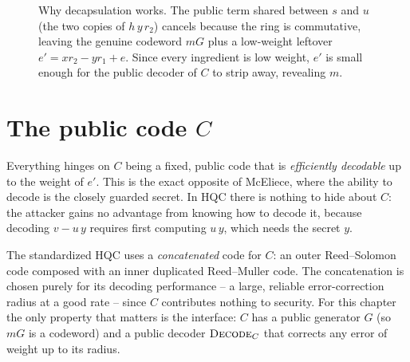 \begin{figure}[H]
\centering
{}
\caption{Why decapsulation works. The public term shared between $s$ and $u$ (the two copies of $h\,y\,r_2$) cancels because the ring is commutative, leaving the genuine codeword $mG$ plus a low-weight leftover $e' = x r_2 - y r_1 + e$. Since every ingredient is low weight, $e'$ is small enough for the public decoder of $C$ to strip away, revealing $m$.}
\label{fig:hqc-cancellation}
\end{figure}

\section{The public code $C$}

Everything hinges on $C$ being a fixed, public code that is \emph{efficiently decodable} up to the weight of $e'$. This is the exact opposite of McEliece, where the ability to decode is the closely guarded secret. In HQC there is nothing to hide about $C$: the attacker gains no advantage from knowing how to decode it, because decoding $v - u\,y$ requires first computing $u\,y$, which needs the secret $y$.

The standardized HQC uses a \emph{concatenated} code for $C$: an outer Reed--Solomon code composed with an inner duplicated Reed--Muller code. The concatenation is chosen purely for its decoding performance -- a large, reliable error-correction radius at a good rate -- since $C$ contributes nothing to security. For this chapter the only property that matters is the interface: $C$ has a public generator $G$ (so $mG$ is a codeword) and a public decoder $\textsc{Decode}_C$ that corrects any error of weight up to its radius.


